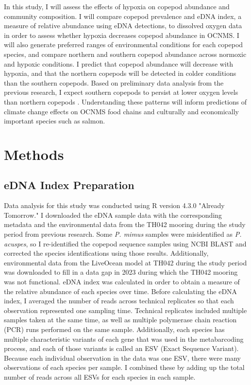 \documentclass[12pt,twoside]{reedthesis}
\begin{document}
In this study, I will assess the effects of hypoxia on copepod abundance and community composition. I will compare copepod prevalence and eDNA index, a measure of relative abundance using eDNA detections, to dissolved oxygen data in order to assess whether hypoxia decreases copepod abundance in OCNMS. I will also generate preferred ranges of environmental conditions for each copepod species, and compare northern and southern copepod abundance across normoxic and hypoxic conditions. I predict that copepod abundance will decrease with hypoxia, and that the northern copepods will be detected in colder conditions than the southern copepods. Based on preliminary data analysis from the previous research, I expect southern copepods to persist at lower oxygen levels than northern copepods \autocite{Crotty2024}. Understanding these patterns will inform predictions of climate change effects on OCNMS food chains and culturally and economically important species such as salmon.
	
    \chapter{Methods}

	\section{eDNA Index Preparation}\label{MethodseDNA}
	Data analysis for this study was conducted using R version 4.3.0 "Already Tomorrow." I downloaded the eDNA sample data with the corresponding metadata and the environmental data from the TH042 mooring during the study period from previous research. Some \textit{P. mimus} samples were misidentified as \textit{P. acuspes}, so I re-identified the copepod sequence samples using NCBI BLAST and corrected the species identifications using those results. Additionally, environmental data from the LiveOcean model at TH042 during the study period was downloaded to fill in a data gap in 2023 during which the TH042 mooring was not functional. eDNA index was calculated in order to obtain a measure of the relative abundance of each species over time. Before calculating the eDNA index, I averaged the number of reads across technical replicates so that each observation represented one sampling time. Technical replicates included multiple samples taken at the same time, as well as multiple polymerase chain reaction (PCR) runs performed on the same sample. Additionally, each species has multiple characteristic variants of each gene that was used in the metabarcoding process, and each of those variants is called an ESV (Exact Sequence Variant). Because each individual observation in the data was one ESV, there were many observations of each species per sample. I combined these by adding up the total number of reads across all ESVs for each species in each sample. 
	
\end{document}
